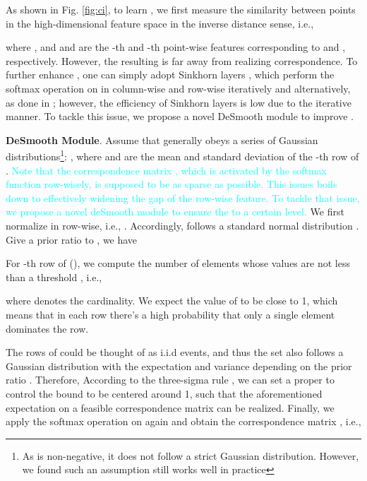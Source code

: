 \documentclass[final]{cvpr}
\begin{document}
As shown in Fig. \ref{fig:ci}, to learn , we first measure the similarity between points in the high-dimensional feature space in the inverse distance sense, i.e.,  

where , and  and  are the -th and -th point-wise features corresponding to  and , respectively. However, the resulting  is far away from realizing correspondence. To further enhance , one can simply adopt Sinkhorn layers \cite{mena2018learning}, which perform the softmax operation on in column-wise and row-wise iteratively and alternatively, as done in \cite{yew2020rpm}; however, the efficiency of Sinkhorn layers is low due to the iterative manner. To tackle this issue, we propose a novel DeSmooth module to improve . 








\textbf{DeSmooth Module}.
Assume that  generally obeys a series of Gaussian distributions\footnote{As  is non-negative, it does not follow a strict Gaussian distribution. However, we found such an assumption still works well in practice}: 
,  where  and  are the mean and standard deviation of the -th row of .
\textcolor{cyan}{Note that the correspondence matrix , which is activated by the softmax function row-wisely, is supposed to be as sparse as possible. This issues boils down to effectively widening the gap of the row-wise feature. To tackle that issue, we propose a novel deSmooth module to ensure the to a certain level.}
\fi
We first normalize  in row-wise, i.e., . 
Accordingly,  follows a  standard normal distribution 
.
Give a prior ratio  to , we have

For -th row of  (), we compute the number of elements whose values are not less than a threshold , i.e.,

where  denotes the cardinality.
We expect the value of  to be close to 1, which means that in each row there's a high probability that only a single element dominates the row. 

The  rows of  could be thought of as  i.i.d events, and thus the set  also follows a Gaussian distribution 
with the expectation  and variance  
depending on the prior ratio . 
Therefore, According to the three-sigma rule \cite{pukelsheim1994three}, we can set a proper  to control the bound  to be centered around 1, such that the aforementioned expectation on a feasible correspondence matrix can be realized. 
Finally, we apply the softmax operation on  again and obtain the correspondence matrix , i.e.,
\end{document}
